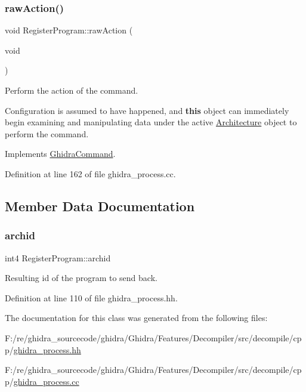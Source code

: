 \subsubsection{\texorpdfstring{rawAction()}{rawAction()}}
{\footnotesize\ttfamily void Register\+Program\+::raw\+Action (\begin{DoxyParamCaption}\item[{void}]{ }\end{DoxyParamCaption})\hspace{0.3cm}{\ttfamily [virtual]}}



Perform the action of the command. 

Configuration is assumed to have happened, and {\bfseries{this}} object can immediately begin examining and manipulating data under the active \mbox{\hyperlink{class_architecture}{Architecture}} object to perform the command. 

Implements \mbox{\hyperlink{class_ghidra_command_a7d1a5cfedfd8f1d05161d27627302716}{Ghidra\+Command}}.



Definition at line 162 of file ghidra\+\_\+process.\+cc.



\subsection{Member Data Documentation}
\mbox{\label{class_register_program_a1b29c81cd1e53d56e6521e5ad2f54823}} 
\subsubsection{\texorpdfstring{archid}{archid}}
{\footnotesize\ttfamily int4 Register\+Program\+::archid}



Resulting id of the program to send back. 



Definition at line 110 of file ghidra\+\_\+process.\+hh.



The documentation for this class was generated from the following files\+:\begin{DoxyCompactItemize}
\item 
F\+:/re/ghidra\+\_\+sourcecode/ghidra/\+Ghidra/\+Features/\+Decompiler/src/decompile/cpp/\mbox{\hyperlink{ghidra__process_8hh}{ghidra\+\_\+process.\+hh}}\item 
F\+:/re/ghidra\+\_\+sourcecode/ghidra/\+Ghidra/\+Features/\+Decompiler/src/decompile/cpp/\mbox{\hyperlink{ghidra__process_8cc}{ghidra\+\_\+process.\+cc}}\end{DoxyCompactItemize}
